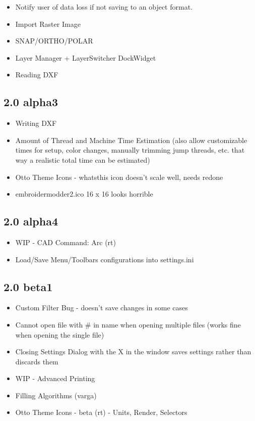 \documentclass[a4paper]{report}
\begin{document}
\begin{itemize}
\item Notify user of data loss if not saving to an object format.
\item Import Raster Image
\item SNAP/ORTHO/POLAR
\item Layer Manager + LayerSwitcher DockWidget
\item Reading DXF
\end{itemize}

\subsection{2.0 alpha3}

\begin{itemize}
\item Writing DXF
\item Amount of Thread and Machine Time Estimation (also allow customizable times for setup, color changes, manually trimming jump threads, etc. that way a realistic total time can be estimated)
\item Otto Theme Icons - whatsthis icon doesn't scale well, needs redone
\item embroidermodder2.ico 16 x 16 looks horrible
\end{itemize}

\subsection{2.0 alpha4}

\begin{itemize}
\item WIP - CAD Command: Arc (rt)
\item Load/Save Menu/Toolbars configurations into settings.ini
\end{itemize}

\subsection{2.0 beta1}

\begin{itemize}
\item Custom Filter Bug - doesn't save changes in some cases
\item Cannot open file with \# in name when opening multiple files (works fine when opening the single file)
\item Closing Settings Dialog with the X in the window saves settings rather than discards them
\item WIP - Advanced Printing
\item Filling Algorithms (varga)
\item Otto Theme Icons - beta (rt) - Units, Render, Selectors
\end{itemize}
\end{document}
